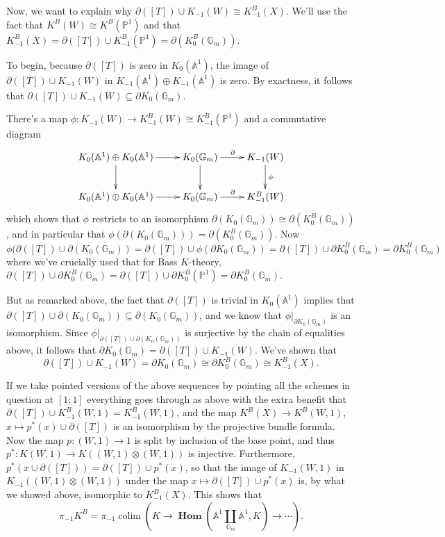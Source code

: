 \documentclass[edeposit,fullpage]{uiucthesis2009}
\newcommand{\mbb}{\mathbb}
\DeclareMathOperator*{\colim}{colim}
\DeclareMathOperator{\iHom}{\mathbf{Hom}}
\theoremstyle{plain}
\numberwithin{lemma}{section}
\theoremstyle{definition}
\begin{document}
Now,
we want to explain why $\partial([T]) \cup K_{-1}(W) \cong
K^B_{-1}(X)$. We'll use the fact that $K^B(W) \cong K^B(\mbb P^1)$ and that
$K^B_{-1}(X) = \partial([T]) \cup K^B_{-1}(\mbb P^1)
= \partial(K^B_0(\mbb G_m))$. 

To begin, because $\partial([T])$ is zero in
$K_0(\mbb A^1)$, the image of $\partial([T]) \cup K_{-1}(W)$ in
$K_{-1}(\mbb A^1) \oplus K_{-1}(\mbb A^1)$ is zero. By exactness, it follows that
$\partial([T]) \cup K_{-1}(W)  \subseteq  \partial K_0(\mbb G_m)$. 

There's a map $\phi : K_{-1}(W) \rightarrow K_{-1}^B(W) \cong
K_{-1}^B(\mbb P^1)$ and a commutative diagram
\[
\xymatrix{K_0(\mbb A^1) \oplus K_0(\mbb A^1) \ar[r] \ar[d] & K_0(\mbb
  G_m) \ar[r]^\partial \ar[d] & K_{-1}(W) \ar[d]^\phi\\
K_0(\mbb A^1) \oplus K_0(\mbb A^1) \ar[r] & K_0(\mbb
  G_m) \ar[r]^\partial & K_{-1}^B(W)
}
\]
which shows that $\phi$ restricts to an isomorphism $\partial(K_0(\mbb
  G_m)) \cong \partial(K_0^B(\mbb
  G_m))$, and in particular that $\phi(\partial(K_0(\mbb
  G_m)) ) = \partial(K_0^B(\mbb
  G_m))$. Now 
\[
\phi(\partial([T]) \cup \partial(K_{0}(\mbb G_m)) = \partial([T]) \cup
  \phi(\partial K_{0}(\mbb G_m)) = \partial([T]) \cup \partial
  K_{0}^B(\mbb G_m) = \partial K_0^B(\mbb G_m)
\]
where we've crucially used that for Bass $K$-theory, $\partial([T])
\cup \partial K_0^B(\mbb G_m) = \partial([T])
\cup \partial K_0^B(\mbb P^1) = \partial K_0^B(\mbb G_m)$. 

But as remarked above, the fact that $\partial([T])$ is trivial in
$K_0(\mbb A^1)$ implies that $\partial([T]) \cup \partial(K_{0}(\mbb G_m))
\subseteq \partial(K_{0}(\mbb G_m))$, and we know that
$\phi|_{\partial K_0(\mbb G_m)}$ is an isomorphism. Since
$\phi|_{\partial([T]) \cup \partial(K_{0}(\mbb G_m))}$ is surjective
by the chain of equalities above,
it follows that $\partial
K_0(\mbb G_m) =\partial([T]) \cup K_{-1}(W)$. We've shown that
\[
\partial([T]) \cup K_{-1}(W) = \partial K_0(\mbb G_m) \cong \partial
K_0^B(\mbb G_m) \cong K_{-1}^B(X).
\]

If we take pointed versions of the above sequences by pointing all the
schemes in question at $[1:1]$ everything goes through as above with
the extra benefit that $\partial([T]) \cup K^B_{-1}(W,1) =
K^B_{-1}(W,1)$, and the map $K^B(X) \rightarrow K^B(W,1)$, $x \mapsto
p^*(x) \cup \partial([T])$ is an isomorphism by the projective bundle
formula. Now the map $p : (W,1) \rightarrow 1$ is split by inclusion
of the base point, and thus $p^* : K(W,1) \rightarrow K((W,1) \otimes
(W,1))$ is injective. Furthermore, $p^*(x \cup \partial([T]))
= \partial([T]) \cup p^*(x)$, so that the image of $K_{-1}(W,1)$ in
$K_{-1}((W,1) \otimes (W,1))$ under the map $x \mapsto \partial([T])
\cup p^*(x)$ is, by what we showed above, isomorphic
to $K^B_{-1}(X)$. This shows that
\[
\pi_{-1}K^B = \pi_{-1}\colim(K \rightarrow \iHom(\mbb A^1 \coprod_{\mbb G_m} \mbb
A^1,K) \rightarrow \cdots).
\] 
\end{document}
